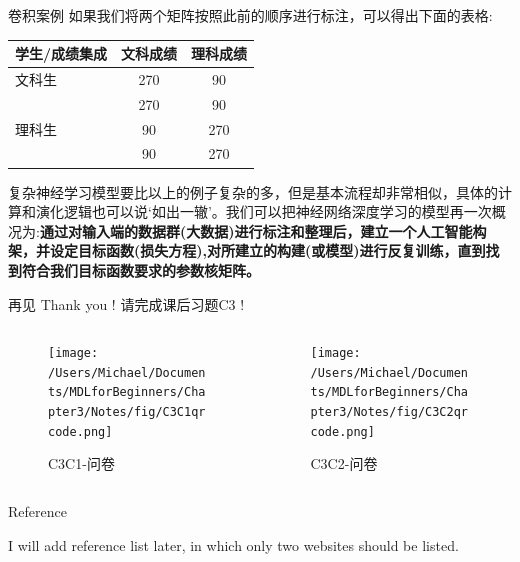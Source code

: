 \documentclass[handout]{beamer}
\begin{document}
\begin{frame}{卷积案例}
如果我们将两个矩阵按照此前的顺序进行标注，可以得出下面的表格:
\begin{table}[H]
\renewcommand{\arraystretch}{1.2}
	\centering
	\begin{tabular}{|l|cc|}
	\hline 
		学生/成绩集成 & 文科成绩 & 理科成绩 \\
		\hline 
		文科生& 270 & 90 \\
		& 270 & 90 \\
		\hline 
		理科生& 90 & 270 \\
		& 90 & 270 \\
		\hline 
	\end{tabular}
\end{table}
{\footnotesize
复杂神经学习模型要比以上的例子复杂的多，但是基本流程却非常相似，具体的计算和演化逻辑也可以说`如出一辙'。我们可以把神经网络深度学习的模型再一次概况为:\textbf{通过对输入端的数据群(大数据)进行标注和整理后，建立一个人工智能构架，并设定目标函数(损失方程),对所建立的构建(或模型)进行反复训练，直到找到符合我们目标函数要求的参数核矩阵。}
}
\end{frame}


\begin{frame}{再见}
	Thank you !  请完成课后习题C3 !
\begin{columns}
	\begin{column}{0.4\textwidth}
			\begin{figure}[H]
				\centering
			\texttt{[image: /Users/Michael/Documents/MDLforBeginners/Chapter3/Notes/fig/C3C1qrcode.png]}
			\caption{C3C1-问卷}
			\end{figure}
	\end{column}
	\begin{column}{0.4\textwidth}
		\begin{figure}[H]
	\texttt{[image: /Users/Michael/Documents/MDLforBeginners/Chapter3/Notes/fig/C3C2qrcode.png]}
	\caption{C3C2-问卷}
\end{figure}	
	\end{column}
\end{columns}
\end{frame}



\begin{frame}[allowframebreaks]{Reference}
  
  
  I will add reference list later, in which only two websites should be listed. 
\end{frame}
\end{document}
